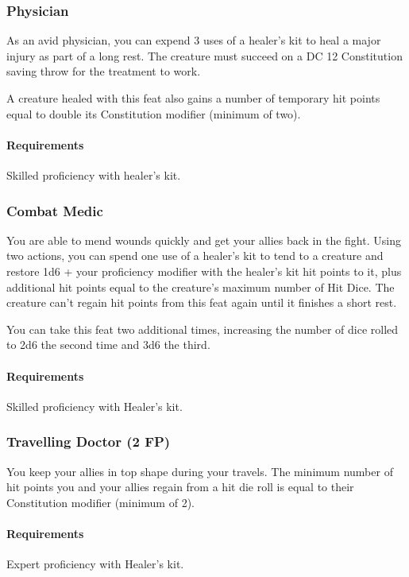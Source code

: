 \subsubsection{Physician} \label{feat::physician}
    As an avid physician, you can expend 3 uses of a healer's kit to heal a major injury as part of a long rest.
    The creature must succeed on a DC 12 Constitution saving throw for the treatment to work.

    A creature healed with this feat also gains a number of temporary hit points equal to double its Constitution modifier (minimum of two).
    \paragraph{Requirements} Skilled proficiency with healer's kit.
\subsubsection{Combat Medic} \label{feat::combatmedic}
    You are able to mend wounds quickly and get your allies back in the fight.
    Using two actions, you can spend one use of a healer's kit to tend to a creature and restore 1d6 + your proficiency modifier with the healer's kit hit points to it, plus additional hit points equal to the creature's maximum number of Hit Dice.
    The creature can't regain hit points from this feat again until it finishes a short rest.

    You can take this feat two additional times, increasing the number of dice rolled to 2d6 the second time and 3d6 the third.
    \paragraph{Requirements} Skilled proficiency with Healer's kit.
\subsubsection{Travelling Doctor (2 FP)} \label{feat::travellingdoctor}
    You keep your allies in top shape during your travels.
    The minimum number of hit points you and your allies regain from a hit die roll is equal to their Constitution modifier (minimum of 2).
    \paragraph{Requirements} Expert proficiency with Healer's kit.

